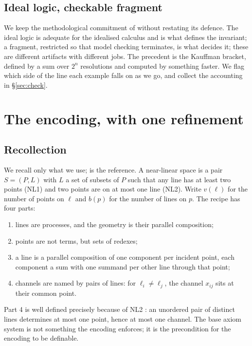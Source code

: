 \documentclass[11pt]{article}
\theoremstyle{plain}
\theoremstyle{definition}
\begin{document}
\subsection{Ideal logic, checkable fragment}

We keep the methodological commitment of \cite[\S1.3]{Classifier} without restating its defence.
The ideal logic is adequate for the idealised calculus and is what defines the invariant; a
fragment, restricted so that model checking terminates, is what decides it; these are different
artifacts with different jobs. The precedent is the Kauffman bracket, defined by a sum over $2^n$
resolutions and computed by something faster. We flag which side of the line each example falls on
as we go, and collect the accounting in \S\ref{sec:check}.

\section{The encoding, with one refinement}

\subsection{Recollection}

We recall only what we use; \cite{Geometry} is the reference. A near-linear space is a pair
$S=(P,L)$ with $L$ a set of subsets of $P$ such that any line has at least two points (NL1) and two
points are on at most one line (NL2). Write $v(\ell)$ for the number of points on $\ell$ and $b(p)$
for the number of lines on $p$. The recipe has four parts:
\begin{enumerate}
\item lines are processes, and the geometry is their parallel composition;
\item points are not terms, but sets of redexes;
\item a line is a parallel composition of one component per incident point, each component a sum
      with one summand per other line through that point;
\item channels are named by pairs of lines: for $\ell_i \neq \ell_j$, the channel $x_{ij}$ sits at
      their common point.
\end{enumerate}
Part 4 is well defined precisely because of NL2 \cite[Prop.~5]{Geometry}: an unordered pair of
distinct lines determines at most one point, hence at most one channel. The base axiom system is
not something the encoding enforces; it is the precondition for the encoding to be definable.
\end{document}
